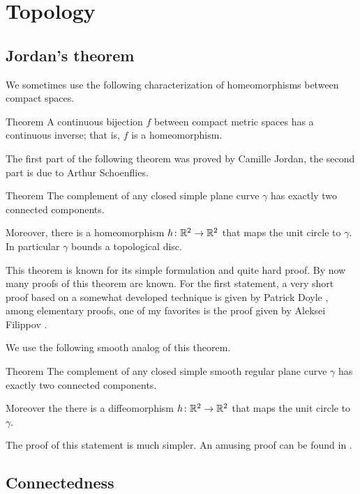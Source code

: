 \chapter{Topology}

\section{Jordan's theorem}

We sometimes use the following characterization of homeomorphisms between compact spaces.

\begin{thm}{Theorem}\label{thm:Hausdorff-compact}
A continuous bijection $f$ between compact metric spaces has a continuous inverse;
that is, $f$ is a homeomorphism.
\end{thm}


The first part of the following theorem was proved by Camille Jordan, the second part is due to Arthur Schoenflies.

\begin{thm}{Theorem}\label{thm:jordan}
The complement of any closed simple plane curve $\gamma$ has exactly two connected components. 

Moreover, there is a homeomorphism $h\colon\mathbb{R}^2\to \mathbb{R}^2$ that maps the unit circle to $\gamma$.
In particular $\gamma$ bounds a topological disc.
\end{thm}

This theorem is known for its simple formulation and quite hard proof.
By now many proofs of this theorem are known.
For the first statement, a very short proof based on a somewhat developed technique is given by Patrick Doyle \cite{doyle},
among elementary proofs, one of my favorites is the proof given by Aleksei Filippov \cite{filippov}.

We use the following smooth analog of this theorem.

\begin{thm}{Theorem}
The complement of any closed simple smooth regular plane curve $\gamma$ has exactly two connected components. 

Moreover the there is a diffeomorphism $h\colon\mathbb{R}^2\to \mathbb{R}^2$ that maps the unit circle to $\gamma$.
\end{thm}

The proof of this statement is much simpler.
An amusing proof can be found in \cite{chambers-liokumovich}.

\section{Connectedness}

